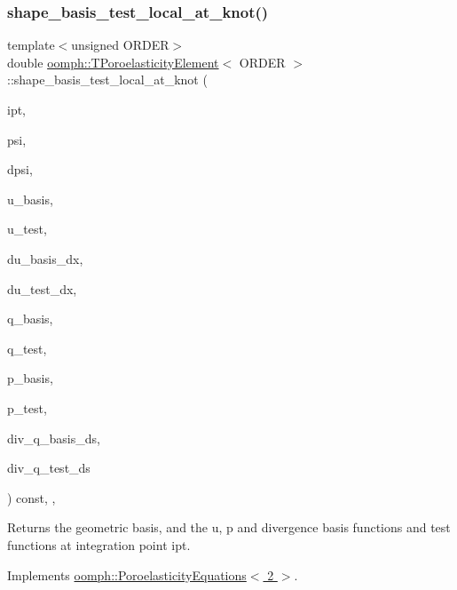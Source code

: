\subsubsection{\texorpdfstring{shape\+\_\+basis\+\_\+test\+\_\+local\+\_\+at\+\_\+knot()}{shape\_basis\_test\_local\_at\_knot()}}
{\footnotesize\ttfamily template$<$unsigned O\+R\+D\+ER$>$ \\
double \hyperlink{classoomph_1_1TPoroelasticityElement}{oomph\+::\+T\+Poroelasticity\+Element}$<$ O\+R\+D\+ER $>$\+::shape\+\_\+basis\+\_\+test\+\_\+local\+\_\+at\+\_\+knot (\begin{DoxyParamCaption}\item[{const unsigned \&}]{ipt,  }\item[{\hyperlink{classoomph_1_1Shape}{Shape} \&}]{psi,  }\item[{\hyperlink{classoomph_1_1DShape}{D\+Shape} \&}]{dpsi,  }\item[{\hyperlink{classoomph_1_1Shape}{Shape} \&}]{u\+\_\+basis,  }\item[{\hyperlink{classoomph_1_1Shape}{Shape} \&}]{u\+\_\+test,  }\item[{\hyperlink{classoomph_1_1DShape}{D\+Shape} \&}]{du\+\_\+basis\+\_\+dx,  }\item[{\hyperlink{classoomph_1_1DShape}{D\+Shape} \&}]{du\+\_\+test\+\_\+dx,  }\item[{\hyperlink{classoomph_1_1Shape}{Shape} \&}]{q\+\_\+basis,  }\item[{\hyperlink{classoomph_1_1Shape}{Shape} \&}]{q\+\_\+test,  }\item[{\hyperlink{classoomph_1_1Shape}{Shape} \&}]{p\+\_\+basis,  }\item[{\hyperlink{classoomph_1_1Shape}{Shape} \&}]{p\+\_\+test,  }\item[{\hyperlink{classoomph_1_1Shape}{Shape} \&}]{div\+\_\+q\+\_\+basis\+\_\+ds,  }\item[{\hyperlink{classoomph_1_1Shape}{Shape} \&}]{div\+\_\+q\+\_\+test\+\_\+ds }\end{DoxyParamCaption}) const\hspace{0.3cm}{\ttfamily [inline]}, {\ttfamily [protected]}, {\ttfamily [virtual]}}



Returns the geometric basis, and the u, p and divergence basis functions and test functions at integration point ipt. 



Implements \hyperlink{classoomph_1_1PoroelasticityEquations_a1fe3d6550d835f62011be7c2c1aa5765}{oomph\+::\+Poroelasticity\+Equations$<$ 2 $>$}.



